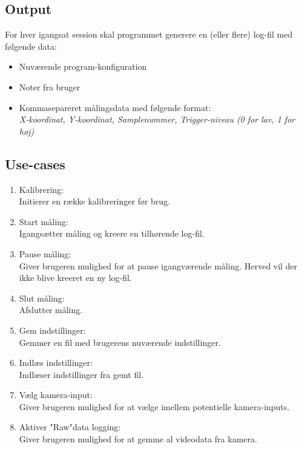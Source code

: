 \documentclass[kravspec.tex]{subfiles}
\begin{document}
\subsection{Output}
For hver igangsat session skal programmet generere en (eller flere) log-fil med følgende data:
\indent \begin{itemize}
	\item Nuværende program-konfiguration
	\item Noter fra bruger
	\item 	Kommasepareret målingsdata med følgende format: \\
	\textit{X-koordinat, Y-koordinat, Samplenummer, Trigger-niveau (0 for lav, 1 for høj)} 
\end{itemize}

\subsection{Use-cases}	
\label{usec}
\begin{enumerate}
	\item Kalibrering: \\Initierer en række kalibreringer før brug. 
	\item Start måling: \\Igangsætter måling og kreere en tilhørende log-fil.
	\item Pause måling: \\Giver brugeren mulighed for at pause igangværende måling. Herved vil der ikke blive kreeret en ny log-fil. 
	\item Slut måling: \\Afslutter måling.
	\item Gem indstillinger: \\Gemmer en fil med brugerens nuværende indstillinger.
	\item Indlæs indstillinger: \\Indlæser indstillinger fra gemt fil.
	\item Vælg kamera-input: \\ Giver brugeren mulighed for at vælge imellem potentielle kamera-inputs.
	\item Aktiver "Raw"data logging: \\ Giver brugeren mulighed for at gemme al videodata fra kamera.
\end{enumerate}
\end{document}
